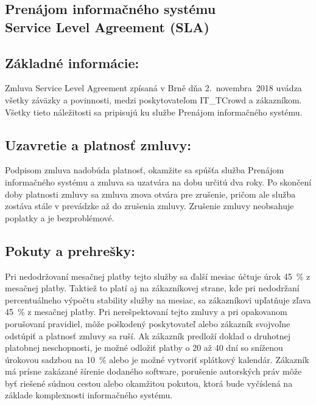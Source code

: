 \documentclass[a4paper, 11pt]{article}
\begin{document}
\setcounter{page}{1}
\begin{center}

\section*{ \Large Prenájom informačného systému \\ Service Level Agreement (SLA)}
\hfill
\subsection*{Základné informácie:}
Zmluva Service Level Agreement zpísaná v Brně dňa 2.~novembra~2018 uvádza všetky záväzky a povinnosti, medzi poskytovateľom IT\_TCrowd a zákazníkom. Všetky tieto náležitosti sa pripisujú ku službe Prenájom informačného systému.

\subsection*{Uzavretie a platnosť zmluvy:}
Podpisom zmluva nadobúda platnosť, okamžite sa spúšťa služba Prenájom informačného systému a zmluva sa uzatvára na dobu určitú dva roky. Po skončení doby platnosti zmluvy sa zmluva znova otvára 
pre zrušenie, pričom ale služba zostáva stále v prevádzke až do zrušenia zmluvy. Zrušenie zmluvy neobsahuje poplatky a je bezproblémové.

\subsection*{Pokuty a prehrešky:}
Pri nedodržovaní mesačnej platby tejto služby sa ďalší mesiac účtuje úrok 45~\% z mesačnej platby. Taktiež to platí aj na zákazníkovej strane, kde pri nedodržaní percentuálneho výpočtu stability
služby na mesiac, sa zákazníkovi upľatňuje zľava 45~\% z mesačnej platby. Pri nerešpektovaní tejto zmluvy a pri opakovanom porušovaní pravidiel, môže poškodený poskytovateľ alebo zákazník svojvoľne
odstúpiť a platnosť zmluvy sa ruší. Ak zákazník predloží doklad o druhotnej platobnej neschopnosti, je možné odložiť platby o 20 až 40 dní so sníženou úrokovou sadzbou na 10~\% alebo je možné vytvoriť splátkový kalendár. Zákazník má prísne zakázané šírenie dodaného software, porušenie autorských práv môže byť riešené súdnou cestou alebo okamžitou pokutou, ktorá bude vyčíslená
na základe komplexnosti informačného systému.


\end{center}
\end{document}
